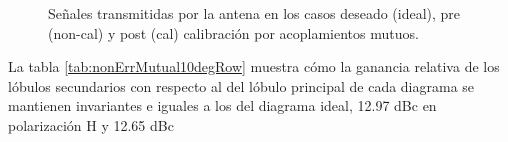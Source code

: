 \begin{figure}[H]
	\centering

	\caption{Señales transmitidas por la antena en los casos deseado (ideal), pre (non-cal) y post (cal) calibración por acoplamientos mutuos.}
	\label{fig:nonErrMutual10degRow}
\end{figure}
La tabla \ref{tab:nonErrMutual10degRow} muestra cómo la ganancia relativa de los lóbulos secundarios con respecto al del lóbulo
principal de cada diagrama se mantienen invariantes e iguales a los del diagrama ideal, 12.97 dBc en polarización H y 12.65 dBc
